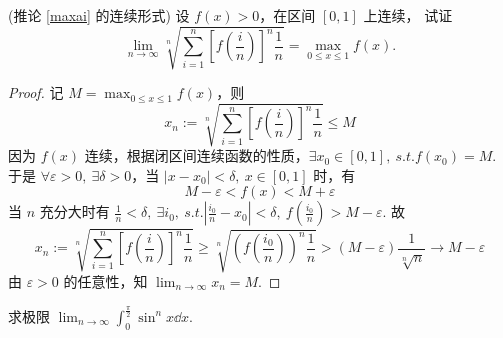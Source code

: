 \begin{example}
    (推论 \ref{maxai} 的连续形式) 设 $f(x)>0$，在区间 $[0,1]$ 上连续，
    试证 $$\lim_{n\to\infty}\sqrt[n]{\sum_{i=1}^{n}\left[f\left(\frac{i}{n}\right)\right]^n\frac{1}{n}}=\max_{0\leqslant x\leqslant 1}f(x).$$
\end{example}
\begin{proof}
    记 $\displaystyle M=\max_{0\leqslant x\leqslant 1}f(x)$，则 $$x_n:= \sqrt[n]{\sum_{i=1}^{n}\left[f\left(\frac{i}{n}\right)\right]^n\frac{1}{n}}\leqslant M$$
    因为 $f(x)$ 连续，根据闭区间连续函数的性质，$\exists x_0\in[0,1],~s.t.f(x_0)=M$.
    于是 $\forall \varepsilon>0,~\exists\delta>0\text{，当 }|x-x_0|<\delta,~x\in[0,1]$ 时，有 $$M-\varepsilon<f(x)<M+\varepsilon$$
    当 $n$ 充分大时有 $\displaystyle \frac{1}{n}<\delta,~\exists i_0,~s.t. \left|\frac{i_0}{n}-x_0\right|<\delta,~f\left(\frac{i_0}{n}\right)>M-\varepsilon$.
    故 $$x_n:= \sqrt[n]{\sum_{i=1}^{n}\left[f\left(\frac{i}{n}\right)\right]^n\frac{1}{n}}\geqslant\sqrt[n]{\left(f\left(\frac{i_0}{n}\right)\right)^n\frac{1}{n}}>(M-\varepsilon)\frac{1}{\sqrt[n]{n}}\to M-\varepsilon$$
    由 $\varepsilon>0$ 的任意性，知 $\displaystyle\lim_{n\to\infty}x_n=M.$
\end{proof}
\begin{example}
    求极限 $\displaystyle\lim_{n\to\infty}\int_{0}^{\frac{\pi}{2}}\sin^nx\dd x.$
\end{example}
